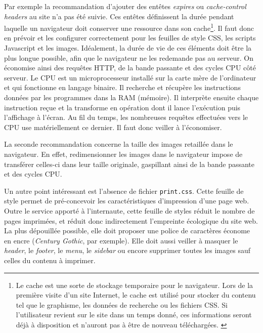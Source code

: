 \documentclass[a4paper,12pt,twoside]{book}
\begin{document}
Par exemple la recommandation d'ajouter des entêtes \textit{expires} ou \textit{cache-control headers} au site n'a pas été suivie. Ces entêtes définissent la durée pendant laquelle un navigateur doit conserver une ressource dans son cache\footnote{Le cache est une sorte de stockage temporaire pour le navigateur. Lors de la première visite d'un site Internet, le cache est utilisé pour stocker du contenu tel que le graphisme, les données de recherche ou les fichiers CSS. Si l'utilisateur revient sur le site dans un temps donné, ces informations seront déjà à disposition et n'auront pas à être de nouveau téléchargées. \cite{cache}}. Il faut donc en prévoir et les configurer correctement pour les feuilles de style \acrshort{CSS}, les scripts Javascript et les images. Idéalement, la durée de vie de ces éléments doit être la plus longue possible, afin que le navigateur ne les redemande pas au serveur. On économise ainsi des requêtes HTTP, de la bande passante et des cycles \acrshort{CPU} côté serveur. Le \acrfull{CPU} est un microprocesseur installé sur la carte mère de l'ordinateur et qui fonctionne en langage binaire. Il recherche et récupère les instructions données par les programmes dans la RAM (mémoire). Il interprète ensuite chaque instruction reçue et la transforme en opération dont il lance l'exécution puis l'affichage à l'écran. Au fil du temps, les nombreuses requêtes effectuées vers le \acrshort{CPU} use matériellement ce dernier. Il faut donc veiller à l'économiser. 

La seconde recommandation concerne la taille des images retaillée dans le navigateur. En effet, redimensionner les images dans le navigateur impose de transférer celles-ci dans leur taille originale, gaspillant ainsi de la bande passante et des cycles \acrshort{CPU}. 

Un autre point intéressant est l'absence de fichier \texttt{print.css}. Cette feuille de style permet de pré-concevoir les caractéristiques d'impression d'une page web. Outre le service apporté à l'internaute, cette feuille de styles réduit le nombre de pages imprimées, et réduit donc indirectement l'empreinte écologique du site web. La plus dépouillée possible, elle doit proposer une police de caractères économe en encre (\textit{Century Gothic}, par exemple). Elle doit aussi veiller à masquer le \textit{header}, le \textit{footer}, le \textit{menu}, le \textit{sidebar} ou encore supprimer toutes les images sauf celles du contenu à imprimer.
\end{document}
